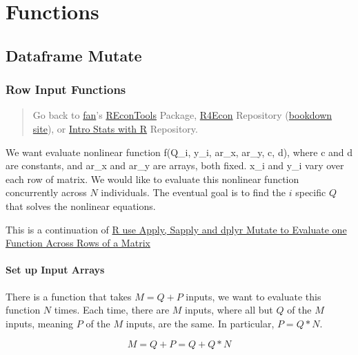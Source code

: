 \documentclass[
]{book}
\begin{document}
\hypertarget{functions}{%
\chapter{Functions}\label{functions}}

\hypertarget{dataframe-mutate}{%
\section{Dataframe Mutate}\label{dataframe-mutate}}

\hypertarget{row-input-functions}{%
\subsection{Row Input Functions}\label{row-input-functions}}

\begin{quote}
Go back to \href{http://fanwangecon.github.io/CodeDynaAsset/}{fan}'s \href{https://fanwangecon.github.io/REconTools/}{REconTools} Package, \href{https://fanwangecon.github.io/R4Econ/}{R4Econ} Repository (\href{https://fanwangecon.github.io/R4Econ/bookdown}{bookdown site}), or \href{https://fanwangecon.github.io/Stat4Econ/}{Intro Stats with R} Repository.
\end{quote}

We want evaluate nonlinear function f(Q\_i, y\_i, ar\_x, ar\_y, c, d), where c and d are constants, and ar\_x and ar\_y are arrays, both fixed. x\_i and y\_i vary over each row of matrix. We would like to evaluate this nonlinear function concurrently across \(N\) individuals. The eventual goal is to find the \(i\) specific \(Q\) that solves the nonlinear equations.

This is a continuation of \href{https://fanwangecon.github.io/R4Econ/function/noloop/fs_applysapplymutate.html}{R use Apply, Sapply and dplyr Mutate to Evaluate one Function Across Rows of a Matrix}

\hypertarget{set-up-input-arrays}{%
\subsubsection{Set up Input Arrays}\label{set-up-input-arrays}}

There is a function that takes \(M=Q+P\) inputs, we want to evaluate this function \(N\) times. Each time, there are \(M\) inputs, where all but \(Q\) of the \(M\) inputs, meaning \(P\) of the \(M\) inputs, are the same. In particular, \(P=Q*N\).

\[M = Q+P = Q + Q*N\]
\end{document}
